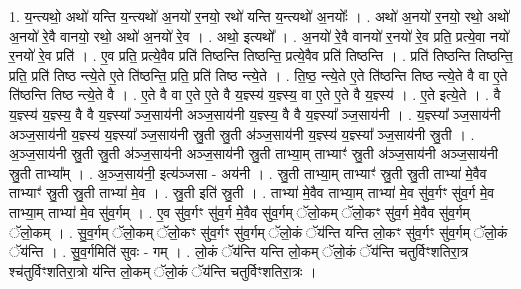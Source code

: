 \documentclass[17pt]{extarticle}
\begin{document}
1. य॒न्त्यथो॒ अथो॑ यन्ति य॒न्त्यथो॑ अ॒नयो॑ र॒नयो॒ रथो॑ यन्ति य॒न्त्यथो॑ अ॒नयोः᳚ । . अथो॑ अ॒नयो॑ र॒नयो॒ रथो॒ अथो॑ अ॒नयो॑ रे॒वै वानयो॒ रथो॒ अथो॑ अ॒नयो॑ रे॒व । . अथो॒ इत्यथो᳚ । . अ॒नयो॑ रे॒वै वानयो॑ र॒नयो॑ रे॒व प्रति॒ प्रत्ये॒वा नयो॑ र॒नयो॑ रे॒व प्रति॑ । . ए॒व प्रति॒ प्रत्ये॒वैव प्रति॑ तिष्ठन्ति तिष्ठन्ति॒ प्रत्ये॒वैव प्रति॑ तिष्ठन्ति । . प्रति॑ तिष्ठन्ति तिष्ठन्ति॒ प्रति॒ प्रति॑ तिष्ठ न्त्ये॒ते ए॒ते ति॑ष्ठन्ति॒ प्रति॒ प्रति॑ तिष्ठ न्त्ये॒ते । . ति॒ष्ठ॒ न्त्ये॒ते ए॒ते ति॑ष्ठन्ति तिष्ठ न्त्ये॒ते वै वा ए॒ते ति॑ष्ठन्ति तिष्ठ न्त्ये॒ते वै । . ए॒ते वै वा ए॒ते ए॒ते वै य॒ज्ञ्स्य॑ य॒ज्ञ्स्य॒ वा ए॒ते ए॒ते वै य॒ज्ञ्स्य॑ । . ए॒ते इत्ये॒ते । . वै य॒ज्ञ्स्य॑ य॒ज्ञ्स्य॒ वै वै य॒ज्ञ्स्या᳚ ञ्ज॒साय॑नी अञ्ज॒साय॑नी य॒ज्ञ्स्य॒ वै वै य॒ज्ञ्स्या᳚ ञ्ज॒साय॑नी । . य॒ज्ञ्स्या᳚ ञ्ज॒साय॑नी अञ्ज॒साय॑नी य॒ज्ञ्स्य॑ य॒ज्ञ्स्या᳚ ञ्ज॒साय॑नी स्रु॒ती स्रु॒ती अ॑ञ्ज॒साय॑नी य॒ज्ञ्स्य॑ य॒ज्ञ्स्या᳚ ञ्ज॒साय॑नी स्रु॒ती । . अ॒ञ्ज॒साय॑नी स्रु॒ती स्रु॒ती अ॑ञ्ज॒साय॑नी अञ्ज॒साय॑नी स्रु॒ती ताभ्या॒म् ताभ्याꣳ॑ स्रु॒ती अ॑ञ्ज॒साय॑नी अञ्ज॒साय॑नी स्रु॒ती ताभ्या᳚म् । . अ॒ञ्ज॒साय॑नी॒ इत्य॑ञ्जसा - अय॑नी । . स्रु॒ती ताभ्या॒म् ताभ्याꣳ॑ स्रु॒ती स्रु॒ती ताभ्या॑ मे॒वैव ताभ्याꣳ॑ स्रु॒ती स्रु॒ती ताभ्या॑ मे॒व । . स्रु॒ती इति॑ स्रु॒ती । . ताभ्या॑ मे॒वैव ताभ्या॒म् ताभ्या॑ मे॒व सु॑व॒र्गꣳ सु॑व॒र्ग मे॒व ताभ्या॒म् ताभ्या॑ मे॒व सु॑व॒र्गम् । . ए॒व सु॑व॒र्गꣳ सु॑व॒र्ग मे॒वैव सु॑व॒र्गम् ॅलो॒कम् ॅलो॒कꣳ सु॑व॒र्ग मे॒वैव सु॑व॒र्गम् ॅलो॒कम् । . सु॒व॒र्गम् ॅलो॒कम् ॅलो॒कꣳ सु॑व॒र्गꣳ सु॑व॒र्गम् ॅलो॒कं ॅय॑न्ति यन्ति लो॒कꣳ सु॑व॒र्गꣳ सु॑व॒र्गम् ॅलो॒कं ॅय॑न्ति । . सु॒व॒र्गमिति॑ सुवः - गम् । . लो॒कं ॅय॑न्ति यन्ति लो॒कम् ॅलो॒कं ॅय॑न्ति चतुर्विꣳशतिरा॒त्र श्च॑तुर्विꣳशतिरा॒त्रो य॑न्ति लो॒कम् ॅलो॒कं ॅय॑न्ति चतुर्विꣳशतिरा॒त्रः । \newline
\end{document}
